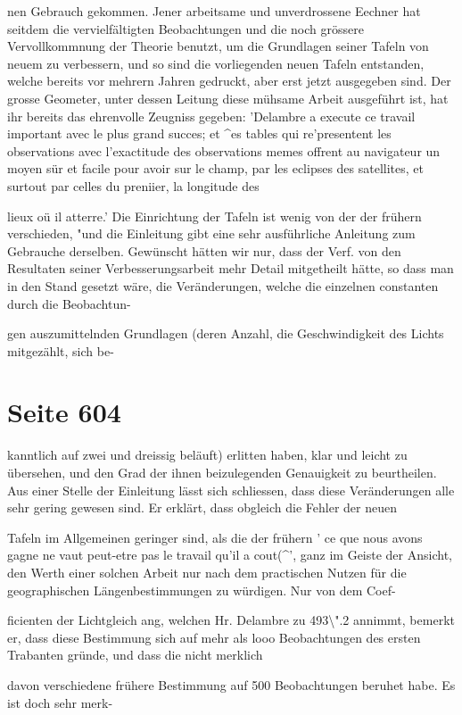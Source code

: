 \documentclass[10pt,a4paper]{article}
\begin{document}
nen Gebrauch gekommen. Jener arbeitsame und unverdrossene Eechner hat seitdem die vervielfältigten Beobachtungen und die noch grössere Vervollkommnung der Theorie benutzt, um die Grundlagen seiner Tafeln von neuem zu verbessern, und so sind die vorliegenden neuen Tafeln entstanden, welche bereits vor mehrern Jahren gedruckt, aber erst jetzt ausgegeben sind. Der grosse Geometer, unter dessen Leitung diese mühsame Arbeit ausgeführt ist, hat ihr bereits das ehrenvolle Zeugniss gegeben: 'Delambre a execute ce travail important avec le plus grand succes; et \textasciicircum{}es tables qui re'presentent les observations avec l'exactitude des observations memes offrent au navigateur un moyen sür et facile pour avoir sur le champ, par les eclipses des satellites, et surtout par celles du preniier, la longitude des

lieux oü il atterre.' Die Einrichtung der Tafeln ist wenig von der der frühern verschieden, "und die Einleitung gibt eine sehr ausführliche Anleitung zum Gebrauche derselben. Gewünscht hätten wir nur, dass der Verf. von den Resultaten seiner Verbesserungsarbeit mehr Detail mitgetheilt hätte, so dass man in den Stand gesetzt wäre, die Veränderungen, welche die einzelnen constanten durch die Beobachtun-

gen auszumittelnden Grundlagen (deren Anzahl, die Geschwindigkeit des Lichts mitgezählt, sich be-


\newpage
\section*{Seite 604}
kanntlich auf zwei und dreissig beläuft) erlitten haben, klar und leicht zu übersehen, und den Grad der ihnen beizulegenden Genauigkeit zu beurtheilen. Aus einer Stelle der Einleitung lässt sich schliessen, dass diese Veränderungen alle sehr gering gewesen sind. Er erklärt, dass obgleich die Fehler der neuen

Tafeln im Allgemeinen geringer sind, als die der frühern ' ce que nous avons gagne ne vaut peut-etre pas le travail qu'il a cout(\textasciicircum{}', ganz im Geiste der Ansicht, den Werth einer solchen Arbeit nur nach dem practischen Nutzen für die geographischen Längenbestimmungen zu würdigen. Nur von dem Coef-

ficienten der Lichtgleich ang, welchen Hr. Delambre zu 493\textbackslash{}".2 annimmt, bemerkt er, dass diese Bestimmung sich auf mehr als looo Beobachtungen des ersten Trabanten gründe, und dass die nicht merklich

davon verschiedene frühere Bestimmung auf 500 Beobachtungen beruhet habe. Es ist doch sehr merk-
\end{document}
